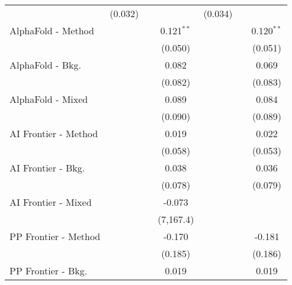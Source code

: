 \begin{tabular}{lcccccc}
                                & (0.032)        &                &                & (0.034)        &                &   \\   
   AlphaFold - Method           &                &                & 0.121$^{**}$   &                &                & 0.120$^{**}$\\   
                                &                &                & (0.050)        &                &                & (0.051)\\   
   AlphaFold - Bkg.             &                &                & 0.082          &                &                & 0.069\\   
                                &                &                & (0.082)        &                &                & (0.083)\\   
   AlphaFold - Mixed            &                &                & 0.089          &                &                & 0.084\\   
                                &                &                & (0.090)        &                &                & (0.089)\\   
   AI Frontier - Method         &                &                & 0.019          &                &                & 0.022\\   
                                &                &                & (0.058)        &                &                & (0.053)\\   
   AI Frontier - Bkg.           &                &                & 0.038          &                &                & 0.036\\   
                                &                &                & (0.078)        &                &                & (0.079)\\   
   AI Frontier - Mixed          &                &                & -0.073         &                &                &   \\   
                                &                &                & (7,167.4)      &                &                &   \\   
   PP Frontier - Method         &                &                & -0.170         &                &                & -0.181\\   
                                &                &                & (0.185)        &                &                & (0.186)\\   
   PP Frontier - Bkg.           &                &                & 0.019          &                &                & 0.019\\   

\end{tabular}
